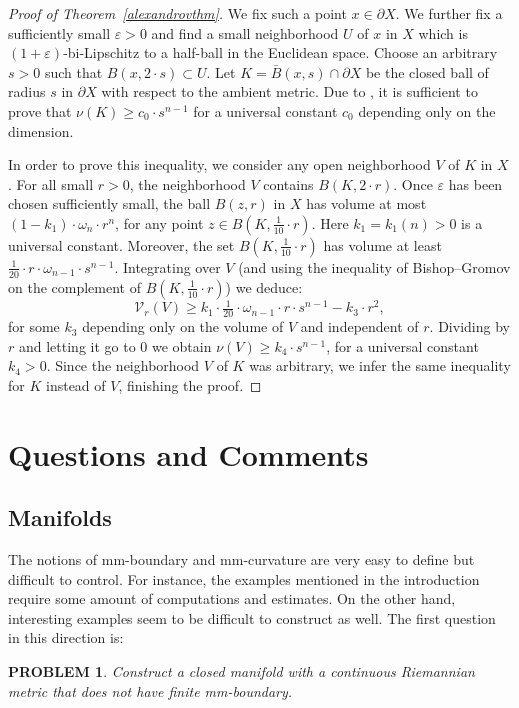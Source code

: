 \documentclass[12pt,leqno,intlimits]{amsart}
\numberwithin{equation}{section}
\newtheorem{quest}[thm]{PROBLEM}
\theoremstyle{definition}
\theoremstyle{remark}
\begin{document}
\begin{proof}[Proof of Theorem~\ref{alexandrovthm}]
We fix such a point $x\in \partial X$. We further fix a sufficiently small $\varepsilon >0$ and find
a small neighborhood $U$ of $x$ in $X$ which is
$(1+\varepsilon)$-bi-Lipschitz to a half-ball in the Euclidean space. Choose an arbitrary $s>0$ such that $B (x,{2{\cdot}s})\subset U$.
Let $K= \bar B (x,s) \cap \partial X$ be the closed ball of radius $s$ in $\partial X$ with respect to the ambient metric.
Due to \cite[Section 1.6]{Evans}, it is sufficient to prove that $\nu (K) \geq c_0 \cdot s^{n-1}$ for a universal constant $c_0$ depending only on the dimension.

In order to prove this inequality, we consider any open neighborhood $V$ of $K$ in $X$.
For all small $r>0$, the neighborhood $V$ contains $B (K,{2{\cdot}r})$.
Once $\varepsilon$ has been chosen sufficiently small, the ball $B (z,r)$ in $X$ has volume at most
$ (1-k_1) \cdot \omega _n \cdot r^n$, for
any point $z\in B (K,{\frac 1 {10}{\cdot}r})$. Here $ k_1=k_1(n)>0 $ is a universal constant.
 Moreover, the set $B (K,{\frac 1 {10}{\cdot}r})$ has volume at least
 $\frac 1 {20} \cdot r \cdot \omega _{n-1} \cdot s^{n-1}$.
Integrating over $V$ (and using the inequality of Bishop--Gromov on the complement of $B (K,{\frac 1 {10}{\cdot}r})$) we deduce:
$$\mathcal{V}_r (V) \geq k_1\cdot \tfrac 1 {20} \cdot \omega _{n-1} \cdot r\cdot s^{n-1} - k_3 \cdot r^2 ,$$
for some $k_3$ depending only on the volume of $V$ and independent of $r$.
Dividing by $r$ and letting it go to $0$ we obtain $\nu (V) \geq k_4\cdot s^{n-1}$, for a universal constant $k_4>0$.
Since the neighborhood $V$ of $K$ was arbitrary,
we infer the same inequality for $K$ instead of $V$, finishing the proof.
\end{proof}

\section{Questions and Comments} \label{sec:final}
\subsection{Manifolds}
The notions of mm-boundary and mm-curvature are very easy to define but difficult to control.
For instance, the examples mentioned in the introduction require some amount of computations and estimates. On the other hand,
interesting   examples  seem to be difficult to construct as well. The first question in this direction is:

\begin{quest}
Construct a closed  manifold with a continuous Riemannian metric
that does not have finite mm-boundary.
\end{quest}
\end{document}
